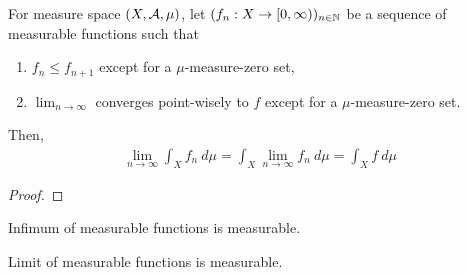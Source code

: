 \documentclass[11pt]{article}
\begin{document}
	\begin{theorem}
		For measure space $(X, \mathcal{{A}}, \mu)$, let $(f_n: X \to [0,\infty))_{n \in \mathbb{N}}$ be a sequence of measurable functions such that
		\begin{enumerate}
			\item $f_{n} \leq f_{n+1}$ except for a $\mu$-measure-zero set,
			\item $\lim_{n\to\infty}$ converges point-wisely to $f$ except for a $\mu$-measure-zero set.
		\end{enumerate}
		Then,
		\begin{align}
			\lim_{n \to \infty} \int_X f_n\ d\mu = \int_X \lim_{n \to \infty} f_n\ d\mu = \int_X f\ d\mu
		\end{align}
	\end{theorem}
	
	\begin{proof}
		
	\end{proof}
	
	\begin{proposition}
		Infimum of measurable functions is measurable.
	\end{proposition}
	
	\begin{proposition}
		Limit of measurable functions is measurable.
	\end{proposition}
\end{document}
